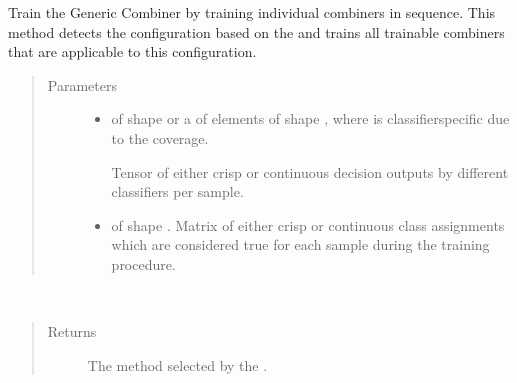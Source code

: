 \documentclass[letterpaper,10pt,english]{sphinxmanual}
\begin{document}
\begin{fulllineitems}
\begin{fulllineitems}
\label{\detokenize{pusion.auto.auto_combiner:pusion.auto.auto_combiner.AutoCombiner.train_seq}}
\sphinxAtStartPar
Train the Generic Combiner by training individual combiners in sequence.
This method detects the configuration based on the  and trains all trainable combiners
that are applicable to this configuration.
\begin{quote}\begin{description}
\item[{Parameters}] \leavevmode\begin{itemize}
\item {} 
\sphinxAtStartPar
{} \textendash{} 
\sphinxAtStartPar
{} of shape  or a  of
 elements of shape , where  is classifier\sphinxhyphen{}specific
due to the coverage.

\sphinxAtStartPar
Tensor of either crisp or continuous decision outputs by different classifiers per sample.


\item {} 
\sphinxAtStartPar
{} \textendash{}  of shape .
Matrix of either crisp or continuous class assignments which are considered true for each sample during
the training procedure.

\end{itemize}

\end{description}\end{quote}

\end{fulllineitems}


\begin{fulllineitems}
\label{\detokenize{pusion.auto.auto_combiner:pusion.auto.auto_combiner.AutoCombiner.get_selected_combiner}}~\begin{quote}\begin{description}
\item[{Returns}] \leavevmode
\sphinxAtStartPar
The method selected by the .

\end{description}\end{quote}

\end{fulllineitems}


\end{fulllineitems}
\end{document}
